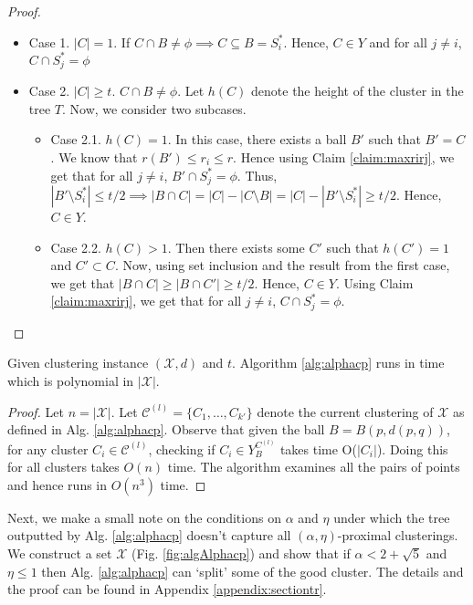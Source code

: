 \documentclass[anon,12pt]{colt2016} %
\newcommand{\mc}{\mathcal}
\begin{document}
\begin{proof}
\begin{itemize}[nolistsep]
\item Case 1. $|C| = 1$. If $C \cap B \neq \phi \implies C \subseteq B = S_i^*$. Hence, $C \in Y$ and for all $j \neq i$, $C \cap S_j^* = \phi$

\item Case 2. $|C|\ge t$. $C \cap B \neq \phi$. Let $h(C)$ denote the height of the cluster in the tree $T$. Now, we consider two subcases.
\begin{itemize}
\renewcommand\labelitemii{$\circ$}
\item Case 2.1. $h(C) = 1$. In this case, there exists a ball $B'$ such that $B' = C$. We know that $r(B') \le r_i \le r$. Hence using Claim \ref{claim:maxrirj}, we get that for all $j \neq i$, $B' \cap S_j^* = \phi$. Thus, $|B'\setminus S_i^*| \le t/2 \implies |B\cap C| = |C| - |C\setminus B| = |C| - |B'\setminus S_i^*| \ge t/2$. Hence, $C \in Y$.

\item Case 2.2. $h(C) > 1$. Then there exists some $C'$ such that $h(C') = 1$ and $C' \subset C$. Now, using set inclusion and the result from the first case, we get that $|B\cap C| \ge |B\cap C'| \ge t/2$. Hence, $C \in Y$. Using Claim \ref{claim:maxrirj}, we get that for all $j \neq i$, $C \cap S_j^* = \phi$.
\end{itemize} 
\end{itemize}
\end{proof}

\begin{theorem}
\label{thm:algcptime}
Given clustering instance $(\mc X, d)$ and $t$. Algorithm \ref{alg:alphacp} runs in time which is polynomial in $|\mc X|$.
\end{theorem}

\begin{proof}
Let $n = |\mc X|$. Let $\mc C^{(l)} =\{C_1, \ldots, C_{k'}\}$ denote the current clustering of $\mc X$ as defined in Alg. \ref{alg:alphacp}. Observe that given the ball $B = B(p, d(p, q))$, for any cluster $C_i \in \mc C^{(l)}$, checking if $C_i \in Y_B^{C^{(l)}}$ takes time O($|C_i|$). Doing this for all clusters takes $O(n)$ time. The algorithm examines all the pairs of points and hence runs in $O(n^3)$ time.
\end{proof}

Next, we make a small note on the conditions on $\alpha$ and $\eta$ under which the tree outputted by Alg. \ref{alg:alphacp} doesn't capture all $(\alpha, \eta)$-proximal clusterings. We construct a set $\mc X$ (Fig. \ref{fig:algAlphacp}) and show that if $\alpha < 2 + \sqrt{5}$ and $\eta \le 1$ then Alg. \ref{alg:alphacp} can `split' some of the good cluster. The details and the proof can be found in Appendix \ref{appendix:sectiontr}.
 
\end{document}
